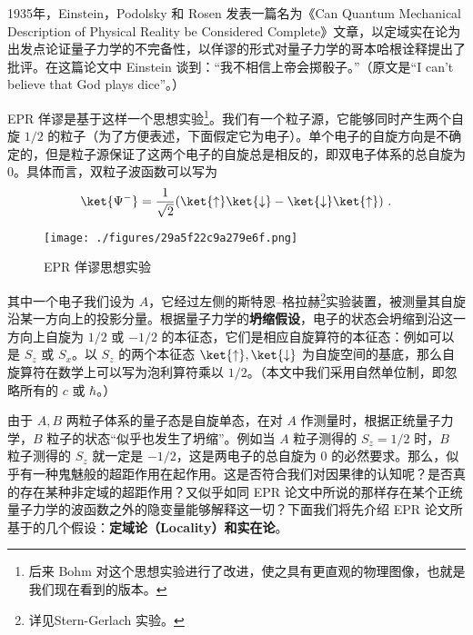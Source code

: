 
1935年，Einstein，Podolsky 和 Rosen 发表一篇名为《Can Quantum Mechanical Description of Physical Reality be Considered Complete》文章，以定域实在论为出发点论证量子力学的不完备性，以佯谬的形式对量子力学的哥本哈根诠释提出了批评。在这篇论文中 Einstein 谈到：“我不相信上帝会掷骰子。”（原文是“I can't believe that God plays dice”。） 

EPR 佯谬是基于这样一个思想实验\footnote{后来 Bohm 对这个思想实验进行了改进，使之具有更直观的物理图像，也就是我们现在看到的版本。}。我们有一个粒子源，它能够同时产生两个自旋 $1/2$ 的粒子（为了方便表述，下面假定它为电子）。单个电子的自旋方向是不确定的，但是粒子源保证了这两个电子的自旋总是相反的，即双电子体系的总自旋为 $0$。具体而言，双粒子波函数可以写为
\begin{equation}
\ket{\Psi^-}=\frac{1}{\sqrt{2}}(\ket{\uparrow}\ket{\downarrow}-\ket{\downarrow}\ket{\uparrow})~.
\end{equation}

\begin{figure}[ht]
\centering
\texttt{[image: ./figures/29a5f22c9a279e6f.png]}
\caption{EPR 佯谬思想实验} \label{fig_EPR_1}
\end{figure}

其中一个电子我们设为 $A$，它经过左侧的斯特恩–格拉赫\footnote{详见Stern-Gerlach 实验。}实验装置，被测量其自旋沿某一方向上的投影分量。根据量子力学的\textbf{坍缩假设}，电子的状态会坍缩到沿这一方向上自旋为 $1/2$ 或 $-1/2$ 的本征态，它们是相应自旋算符的本征态：例如可以是 $S_z$ 或 $S_x$。以 $S_z$ 的两个本征态 $\ket{\uparrow},\ket{\downarrow}$ 为自旋空间的基底，那么自旋算符在数学上可以写为泡利算符乘以 $1/2$。（本文中我们采用自然单位制，即忽略所有的 $c$ 或 $\hbar$。）

由于 $A,B$ 两粒子体系的量子态是自旋单态，在对 $A$ 作测量时，根据正统量子力学，$B$ 粒子的状态“似乎也发生了坍缩”。例如当 $A$ 粒子测得的 $S_z=1/2$ 时，$B$ 粒子测得的 $S_z$ 就一定是 $-1/2$，这是两电子的总自旋为 $0$ 的必然要求。那么，似乎有一种鬼魅般的超距作用在起作用。这是否符合我们对因果律的认知呢？是否真的存在某种非定域的超距作用？又似乎如同 EPR 论文中所说的那样存在某个正统量子力学的波函数之外的隐变量能够解释这一切？下面我们将先介绍 EPR 论文所基于的几个假设：\textbf{定域论（Locality）和实在论}。

